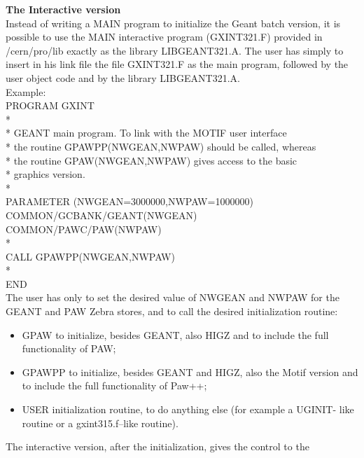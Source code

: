 \oddsidemargin 0.54cm
\evensidemargin 0.0cm
\topmargin -50pt
\textheight 22.5cm 


\pagestyle{plain}
\rm
\Large
{\bf The Interactive version}
\\[2em]
\large
\rm
Instead of writing a MAIN program to initialize the Geant batch
version, it is possible to use the MAIN interactive program (GXINT321.F)
provided in /cern/pro/lib exactly as the library LIBGEANT321.A. The user
has simply to insert in his link file the file GXINT321.F as the main
program, followed by the user object code and by the library LIBGEANT321.A.
\\[.5em] Example: \\[.1em]
       PROGRAM GXINT \\[.1em]
* \\[.1em]
*     GEANT main program. To link with the MOTIF user interface \\[.1em]
*     the routine GPAWPP(NWGEAN,NWPAW) should be called, whereas \\[.1em]
*     the routine GPAW(NWGEAN,NWPAW) gives access to the basic \\[.1em]
*     graphics version. \\[.1em]
* \\[.1em]
      PARAMETER (NWGEAN=3000000,NWPAW=1000000) \\[.1em]
      COMMON/GCBANK/GEANT(NWGEAN) \\[.1em]
      COMMON/PAWC/PAW(NWPAW) \\[.1em]
* \\[.1em]
      CALL GPAWPP(NWGEAN,NWPAW) \\[.1em]
* \\[.1em]
      END \\[.5em]
The user has only to set the desired value of NWGEAN and NWPAW for the
GEANT and PAW Zebra stores, and to call the desired initialization routine:
\begin{itemize}
\item GPAW to initialize, besides GEANT, also HIGZ and to include the full
      functionality of PAW;
\item GPAWPP to initialize, besides GEANT and HIGZ, also the Motif version 
      and to include the full functionality of Paw++;
\item USER initialization routine, to do anything else (for example a UGINIT-
      like routine or a gxint315.f--like routine). 
\end{itemize}
The interactive version, after the initialization, gives the control to the
